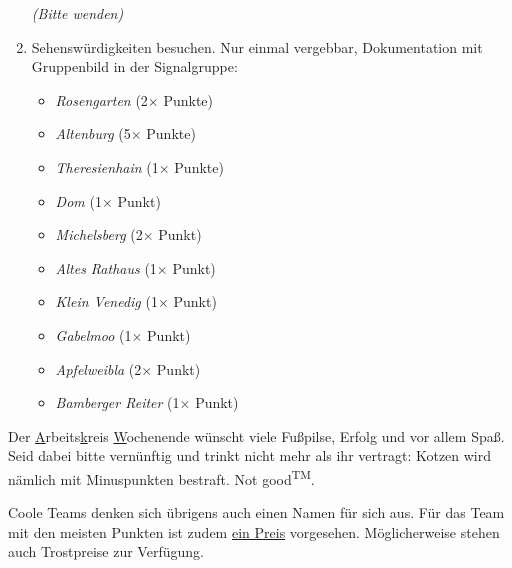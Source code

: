 \documentclass[a5paper,ngerman,xcolor=dvipsnames]{scrartcl}
\begin{document}
\begin{enumerate}
\vspace{0.5em}

\begin{center}\footnotesize\emph{(Bitte wenden)}\hspace{2cm}\textcolor{white}{x}\end{center}
\newpage
\item Sehenswürdigkeiten besuchen. Nur einmal vergebbar, Dokumentation mit Gruppenbild in der Signalgruppe:
    \begin{multicols}{2}
    \begin{itemize}
    \setlength\itemsep{0em}
    \item \emph{Rosengarten} (2$\times$ Punkte)
    \item \emph{Altenburg} (5$\times$ Punkte)
    \item \emph{Theresienhain} (1$\times$ Punkte)
    \item \emph{Dom} (1$\times$ Punkt)
    \item \emph{Michelsberg} (2$\times$ Punkt)
    \item \emph{Altes Rathaus} (1$\times$ Punkt)
    \item \emph{Klein Venedig} (1$\times$ Punkt)
    \item \emph{Gabelmoo} (1$\times$ Punkt)
    \item \emph{Apfelweibla} (2$\times$ Punkt)
    \item \emph{Bamberger Reiter} (1$\times$ Punkt)
    \end{itemize}
    \end{multicols}
\end{enumerate}

{\setul{0.2ex}{0.2ex}Der \ul{A}rbeits\ul{k}reis \ul{W}ochenende}
wünscht viele
Fußpilse, Erfolg und vor allem Spaß.  Seid dabei bitte vernünftig und trinkt
nicht mehr als ihr vertragt: Kotzen wird nämlich mit Minuspunkten bestraft. Not good\textsuperscript{TM}.

\vspace{1.5em}

Coole Teams denken sich übrigens auch einen Namen für sich aus.
Für das Team mit den meisten Punkten ist zudem \ul{ein Preis} vorgesehen.
Möglicherweise stehen auch Trostpreise zur Verfügung.
\end{document}
